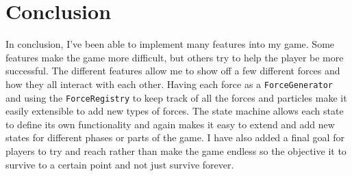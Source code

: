 \documentclass{article}
\begin{document}
\section{Conclusion}
In conclusion, I've been able to implement many features into my game. Some features make the game more difficult, but others try to help the player be more successful. The different features allow me to show off a few different forces and how they all interact with each other. Having each force as a \texttt{ForceGenerator} and using the \texttt{ForceRegistry} to keep track of all the forces and particles make it easily extensible to add new types of forces. The state machine allows each state to define its own functionality and again makes it easy to extend and add new states for different phases or parts of the game. I have also added a final goal for players to try and reach rather than make the game endless so the objective it to survive to a certain point and not just survive forever. 

\printbibliography
\end{document}
